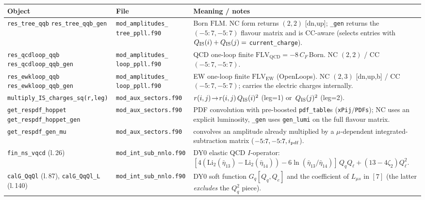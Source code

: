 \documentclass[11pt]{article}
\newcommand{\code}[1]{\texttt{#1}}
\newcommand{\file}[1]{\texttt{#1}}
\newcommand{\FLM}{\ensuremath{\mathrm{FLM}}}
\newcommand{\FLVQCD}{\ensuremath{\mathrm{FLV}_{\mathrm{QCD}}}}
\newcommand{\FLVEW}{\ensuremath{\mathrm{FLV}_{\mathrm{EW}}}}
\newcommand{\Lms}{\ensuremath{L_{\mu s}}}
\newcommand{\zt}{\ensuremath{\zeta_2}}\newcommand{\ztt}{\ensuremath{\zeta_3}}
\begin{document}
\begin{center}\small
\begin{longtable}{@{}p{4.9cm} p{3.3cm} p{6.6cm}@{}}
\toprule
\textbf{Object} & \textbf{File} & \textbf{Meaning / notes}\\
\midrule
\endhead
\code{res\_tree\_qqb} \newline \code{res\_tree\_qqb\_gen}
 & \file{mod\_amplitudes\_} \file{tree\_ppll.f90}
 & Born \FLM. NC form returns $(2,2)$ [dn,up]; \code{\_gen} returns the $(-5{:}7,-5{:}7)$
   flavour matrix and is CC-aware (selects entries with $Q_{\rm IS}(i)+Q_{\rm IS}(j)=$
   \code{current\_charge}).\\
\code{res\_qcdloop\_qqb} \newline \code{res\_qcdloop\_qqb\_gen}
 & \file{mod\_amplitudes\_} \file{loop\_ppll.f90}
 & QCD one-loop finite $\FLVQCD=-8\,C_F\,$Born. NC $(2,2)$ / CC $(-5{:}7,-5{:}7)$.\\
\code{res\_ewkloop\_qqb} \newline \code{res\_ewkloop\_qqb\_gen}
 & \file{mod\_amplitudes\_} \file{loop\_ppll.f90}
 & EW one-loop finite $\FLVEW$ (OpenLoops). NC $(2,3)$ [dn,up,b] / CC $(-5{:}7,-5{:}7)$;
   carries the electric charges internally.\\
\code{multiply\_IS\_charges\_sq(r,leg)}
 & \file{mod\_aux\_sectors.f90}
 & $r(i,j)\!\to\! r(i,j)\,Q_{\rm IS}(i)^2$ (leg=1) or $\,Q_{\rm IS}(j)^2$ (leg=2).\\
\code{get\_respdf\_hoppet} \newline \code{get\_respdf\_hoppet\_gen}
 & \file{mod\_aux\_sectors.f90}
 & PDF convolution with pre-boosted \code{pdf\_table}s (\code{xPij}$/$\code{PDFs}); NC uses an
   explicit luminosity, \code{\_gen} uses \code{gen\_lumi} on the full flavour matrix.\\
\code{get\_respdf\_gen\_mu}
 & \file{mod\_aux\_sectors.f90}
 & convolves an amplitude already multiplied by a $\mu$-dependent integrated-subtraction
   matrix ($-5{:}7,-5{:}7,i_{\rm pdf}$).\\
\code{fin\_ns\_vqcd} (l.\,26)
 & \file{mod\_int\_sub\_nnlo.f90}
 & DY0 elastic QCD $I$-operator: $[4(\mathrm{Li}_2(\bar\eta_{13})-\mathrm{Li}_2(\bar\eta_{14}))
   -6\ln(\bar\eta_{13}/\bar\eta_{14})]\,Q_qQ_\ell+(13-4\zt)Q_\ell^2$.\\
\code{calG\_QqQl} (l.\,87), \newline \code{calG\_QqQl\_L} (l.\,140)
 & \file{mod\_int\_sub\_nnlo.f90}
 & DY0 soft function $G_q[Q_q,Q_e]$ and the coefficient of $\Lms$ in $[7]$
   (the latter \emph{excludes} the $Q_q^2$ piece).\\

\end{longtable}
\end{center}
\end{document}
